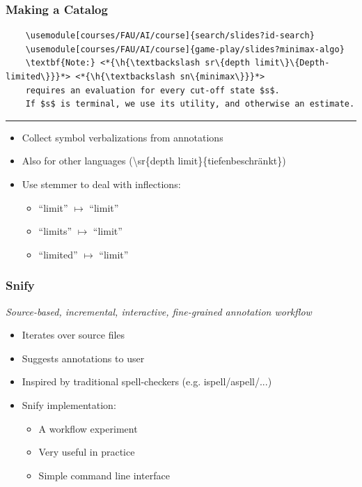 \documentclass[aspectratio=169]{beamer}
\begin{document}
\begin{frame}[fragile]
    \frametitle{Making a Catalog}
    \def\h#1{\colorbox{yellow!50!red!70}{#1}}
    \begin{lstlisting}
    \usemodule[courses/FAU/AI/course]{search/slides?id-search}
    \usemodule[courses/FAU/AI/course]{game-play/slides?minimax-algo}
    \textbf{Note:} <*{\h{\textbackslash sr\{depth limit\}\{Depth-limited\}}}*> <*{\h{\textbackslash sn\{minimax\}}}*>
    requires an evaluation for every cut-off state $s$.
    If $s$ is terminal, we use its utility, and otherwise an estimate.
    \end{lstlisting}

    \noindent\rule{\textwidth}{0.8pt}
    \begin{itemize}
        \item Collect symbol verbalizations from annotations
        \item Also for other languages (\textbackslash sr\{depth limit\}\{tiefenbeschr\"ankt\})
        \item Use stemmer to deal with inflections:
            \begin{itemize}
                \item ``limit'' $\mapsto$ ``limit''
                \item ``limits'' $\mapsto$ ``limit''
                \item ``limited'' $\mapsto$ ``limit''
            \end{itemize}
    \end{itemize}
    
\end{frame}


\begin{frame}
    \frametitle{Snify}
    {\centering\it\large Source-based, incremental, interactive, fine-grained annotation workflow\par\vspace{1.5em}}
    \begin{itemize}
        \item Iterates over source files
        \item Suggests annotations to user
        \item Inspired by traditional spell-checkers (e.g. ispell/aspell/...)
        \item Snify implementation:
            \begin{itemize}
                \item A workflow experiment
                \item Very useful in practice
                \item Simple command line interface
            \end{itemize}
    \end{itemize}
\end{frame}
\end{document}
